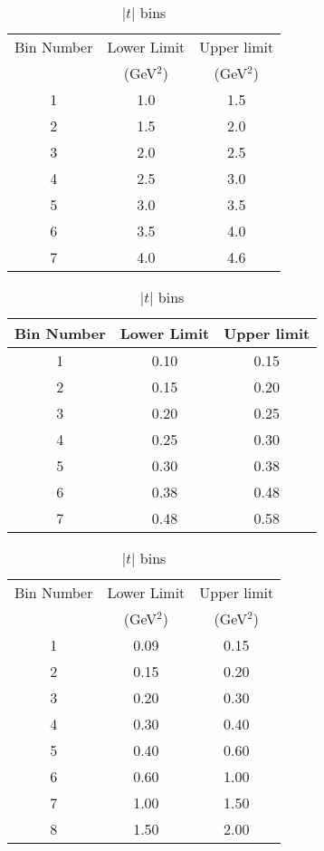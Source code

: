 \documentclass[prc,floatfix,twocolumn,superscriptaddress,letter]{revtex4}
\begin{document}
\begingroup
\squeezetable
\begin{table}
\caption{$Q^2$ bins}
\begin{ruledtabular}
\begin{tabular}{ccc}
Bin Number & Lower Limit & Upper limit \\ 
 & (GeV$^2$)   & (GeV$^2$) \\ \hline
1 & 1.0   &  1.5 \\ 
2 & 1.5   &  2.0 \\   
3 & 2.0   &  2.5 \\
4 & 2.5   &  3.0 \\ 
5 & 3.0   &  3.5 \\ 
6 & 3.5   &  4.0 \\  
7 & 4.0   &  4.6 \\
\end{tabular}
\label{q2-bins}
\end{ruledtabular}



\caption{$x_B$ bins}
\begin{ruledtabular}
\begin{tabular}{ccc}
Bin Number & Lower Limit & Upper limit \\ \hline
1 & 0.10   &  0.15 \\
2 & 0.15   &  0.20 \\  
3 & 0.20   &  0.25 \\
4 & 0.25   &  0.30 \\ 
5 & 0.30   &  0.38 \\
6 & 0.38   &  0.48 \\  
7 & 0.48   &  0.58 \\ 
\end{tabular}
\end{ruledtabular}
\label{x-bins}


\caption{$|t|$ bins}
\begin{ruledtabular}
\begin{tabular}{ccc}
Bin Number & Lower Limit & Upper limit \\ 
           & (GeV$^2$)   & (GeV$^2$) \\ \hline

1 & 0.09   &  0.15 \\ 
2 & 0.15   &  0.20 \\   
3 & 0.20   &  0.30 \\ 
4 & 0.30   &  0.40 \\
5 & 0.40   &  0.60 \\
6 & 0.60   &  1.00 \\ 
7 & 1.00   &  1.50 \\
8 & 1.50   &  2.00 \\
\end{tabular}
\end{ruledtabular}
\label{t-bins}
\end{table}
\endgroup
\end{document}
